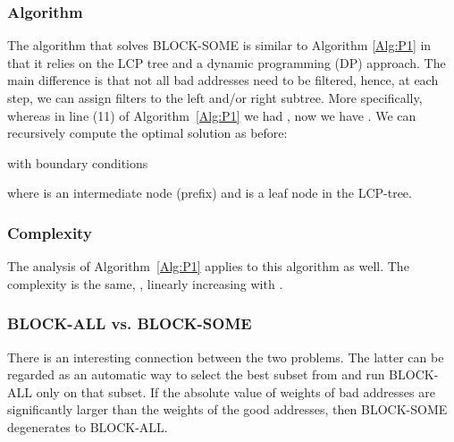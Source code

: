 \subsubsection*{Algorithm} The algorithm that solves BLOCK-SOME is similar to Algorithm \ref{Alg:P1} in that it
relies on the LCP tree and a dynamic programming (DP) approach. The main difference is that not all bad addresses need to be filtered, hence, at each step,
we can assign  filters to the left and/or right subtree.
More specifically, whereas in line (11) of Algorithm~\ref{Alg:P1} we had , now we have .
We can recursively compute the optimal solution as before:

with boundary  conditions

where   is an intermediate node (prefix) and  is a leaf node in the LCP-tree.

\subsubsection*{Complexity} The analysis of Algorithm~\ref{Alg:P1} applies to this algorithm as well.
The complexity is the same, \ie, linearly increasing with .

\subsubsection*{BLOCK-ALL vs. BLOCK-SOME}
There is an interesting connection between the two problems.
The latter can be regarded as an automatic way to select the best subset from 
and run BLOCK-ALL only on that subset.
If the absolute value of weights of bad addresses are significantly larger than the weights of the good addresses,
then BLOCK-SOME degenerates to BLOCK-ALL.


